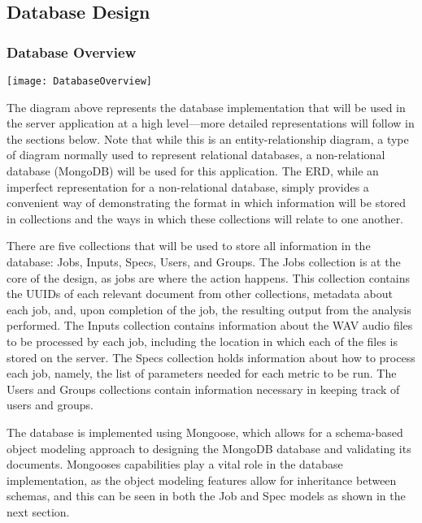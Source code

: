 \subsection{Database Design}
\subsubsection{Database Overview}
\begin{center}
  \texttt{[image: DatabaseOverview]} \\[12pt]
\end{center}
The diagram above represents the database implementation that will be used in the server application at a high level---more detailed representations will follow in the sections below. Note that while this is an entity-relationship diagram, a type of diagram normally used to represent relational databases, a non-relational database (MongoDB) will be used for this application. The ERD, while an imperfect representation for a non-relational database, simply provides a convenient way of demonstrating the format in which information will be stored in collections and the ways in which these collections will relate to one another.\par
There are five collections that will be used to store all information in the database: Jobs, Inputs, Specs, Users, and Groups. The Jobs collection is at the core of the design, as jobs are where the action happens. This collection contains the UUID\textquotesingle s of each relevant document from other collections, metadata about each job, and, upon completion of the job, the resulting output from the analysis performed. The Inputs collection contains information about the WAV audio files to be processed by each job, including the location in which each of the files is stored on the server. The Specs collection holds information about how to process each job, namely, the list of parameters needed for each metric to be run. The Users and Groups collections contain information necessary in keeping track of users and groups.\par
The database is implemented using Mongoose, which allows for a schema-based object modeling approach to designing the MongoDB database and validating its documents. Mongoose\textquotesingle s capabilities play a vital role in the database implementation, as the object modeling features allow for inheritance between schemas, and this can be seen in both the Job and Spec models as shown in the next section.

